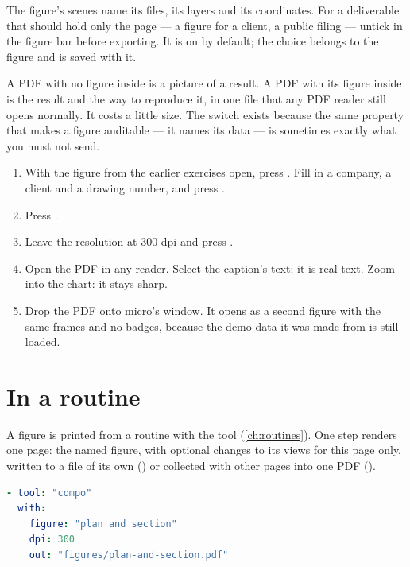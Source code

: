 The figure's scenes name its files, its layers and its coordinates. For a deliverable that should hold only the page — a figure for a client, a public filing — untick  in the figure bar before exporting. It is on by default; the choice belongs to the figure and is saved with it.

\begin{why}
A PDF with no figure inside is a picture of a result. A PDF with its figure inside is the result and the way to reproduce it, in one file that any PDF reader still opens normally. It costs a little size. The switch exists because the same property that makes a figure auditable — it names its data — is sometimes exactly what you must not send.
\end{why}

\begin{tryit}
\begin{enumerate}
\item With the figure from the earlier exercises open, press . Fill in a company, a client and a drawing number, and press .
\item Press .
\item Leave the resolution at 300 dpi and press .
\item Open the PDF in any reader. Select the caption's text: it is real text. Zoom into the chart: it stays sharp.
\item Drop the PDF onto micro's window. It opens as a second figure with the same frames and no badges, because the demo data it was made from is still loaded.
\end{enumerate}
\end{tryit}

\section{In a routine}\label{sec:compo-routine}

A figure is printed from a routine with the  tool (\cref{ch:routines}). One step renders one page: the named figure, with optional changes to its views for this page only, written to a file of its own () or collected with other pages into one PDF ().

\begin{lstlisting}[language=yaml]
- tool: "compo"
  with:
    figure: "plan and section"
    dpi: 300
    out: "figures/plan-and-section.pdf"
\end{lstlisting}

